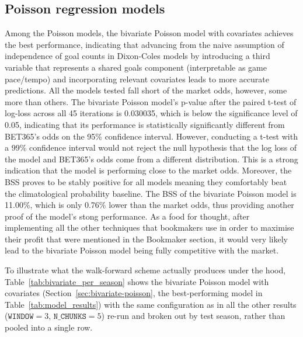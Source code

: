 \documentclass{article}
\begin{document}
\subsection{Poisson regression models}
Among the Poisson models, the bivariate Poisson model with covariates achieves the best performance, indicating that advancing from the naive assumption of independence of goal counts in Dixon-Coles models by introducing a third variable that represents a shared goals component  (interpretable as game pace/tempo) and incorporating relevant covariates leads to more accurate predictions. All the models tested fall short of the market odds, however, some more than others. The bivariate Poisson model's p-value after the paired t-test of log-loss across all 45 iterations is 0.030035, which is below the significance level of 0.05, indicating that its performance is statistically significantly different from BET365's odds on the 95\% confidence interval. However, conducting a t-test with a 99\% confidence interval would not reject the null hypothesis that the log loss of the model and BET365's odds come from a different distribution. This is a strong indication that the model is performing close to the market odds. Moreover, the BSS proves to be stably positive for all models meaning they comfortably beat the climatological probability baseline. The BSS of the bivariate Poisson model is 11.00\%, which is only 0.76\% lower than the market odds, thus providing another proof of the model's stong performance.
As a food for thought, after implementing all the other techniques that bookmakers use in order to maximise their profit that were mentioned in the Bookmaker section, it would very likely lead to the bivariate Poisson model being fully competitive with the market. 



To illustrate what the walk-forward scheme actually produces under the hood, Table~\ref{tab:bivariate_per_season} shows the bivariate Poisson model with covariates (Section~\ref{sec:bivariate-poisson}, the best-performing model in Table~\ref{tab:model_results}) with the same configuration as in all the other results ($\texttt{WINDOW}=3$, $\texttt{N\_CHUNKS}=5$) re-run and broken out by test season, rather than pooled into a single row.
\end{document}
